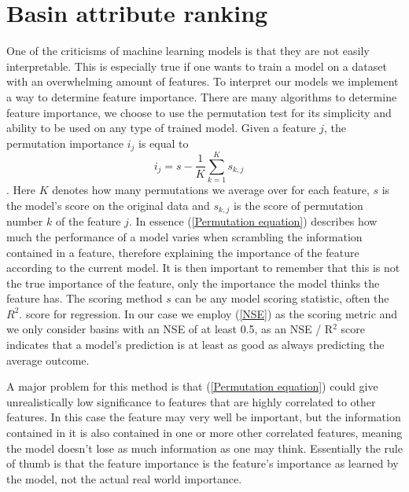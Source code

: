 \section{Basin attribute ranking}
\label{Feature selection}
One of the criticisms of machine learning models
is that they are not easily interpretable. This 
is especially true if one wants to train a model 
on a dataset with an overwhelming amount of 
features. 
 To interpret our models we implement a way to determine feature importance. There 
are many algorithms to determine feature importance, we choose to use the permutation 
test for its simplicity and ability to be used on any type of trained model.
Given a feature $j$, the permutation importance 
$i_j$ is equal to 
\begin{equation}
i_j = s - \frac{1}{K} \sum_{k=1}^K s_{k,j}\quad 
\label{Permutation equation}
\end{equation}
\citep{permutation,breiman2001random}.
Here $K$ denotes how many permutations we average over for each feature, $s$ is
the model's score on the original data and $s_{k,j}$ is the score of permutation 
number $k$ of the feature $j$. In essence (\ref{Permutation equation}) describes 
how much the performance of a model varies when scrambling the information 
contained in a feature, therefore explaining the importance of the feature 
according to the current model. It is then important to remember that this is not 
the true importance of the feature, only the importance the model thinks the feature 
has. The scoring method $s$ can be any model scoring statistic, often the $R^2$. 
score for regression.
In our case we employ (\ref{NSE}) as the scoring metric and we only consider basins 
with an NSE of at least 0.5, as an NSE / R$^2$ score indicates that a model's 
prediction is at least as good as always predicting the average outcome.

A major problem for this method is that (\ref{Permutation equation}) could give 
unrealistically low significance to features that are highly correlated to other 
features. In this case the feature may very well be important, but the information 
contained in it is also contained in one or more other correlated features, meaning 
the model doesn't lose as much information as one may think. Essentially the rule 
of thumb is that the feature importance is the feature's importance as learned by 
the model, not the actual real world importance. 

